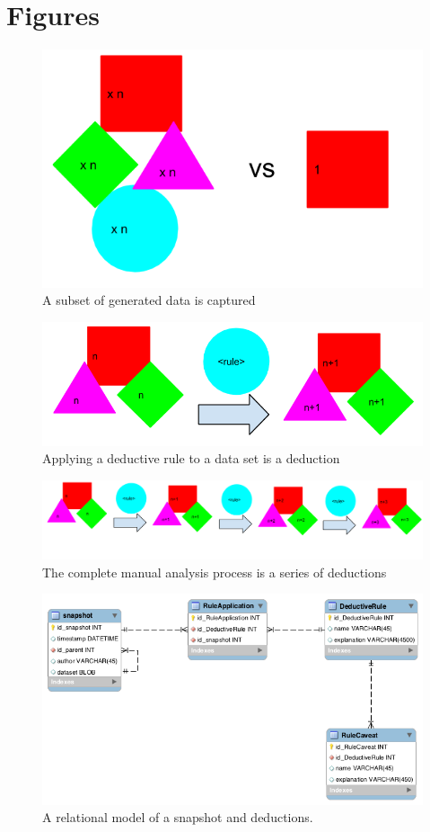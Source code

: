 \clearpage
\section{Figures}

\begin{figure}[h]
  \includegraphics[scale=0.6]{figures/data_captured}
  \caption{A subset of generated data is captured}
  \label{data_captured}
\end{figure}

\begin{figure}
  \includegraphics[scale=0.5]{figures/deduction}
  \caption{Applying a deductive rule to a data set is a deduction}
  \label{deduction}
\end{figure}

\begin{figure}
  \includegraphics[scale=0.25]{figures/deductive_process}
  \caption{The complete manual analysis process is a series of deductions}
  \label{deductive_process}
\end{figure}

\begin{figure}
  \includegraphics[scale=0.5]{figures/deduction_model}
  \caption{A relational model of a snapshot and deductions.}
  \label{deduction_model}
\end{figure}

